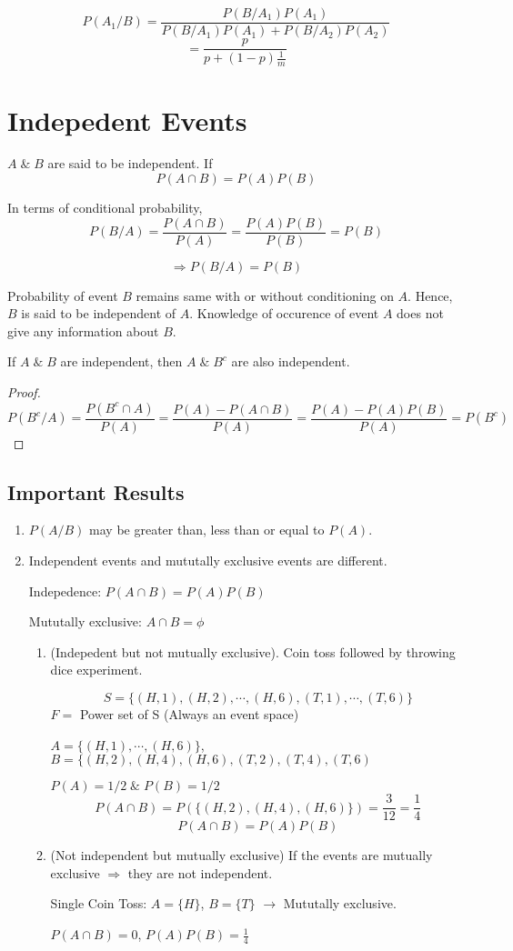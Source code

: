 \documentclass{article}
\begin{document}
$$ P(A_1/B)= \frac{P(B/A_1)P(A_1)}{P(B/A_1)P(A_1)+ P(B/A_2)P(A_2)}$$
$$ = \frac{p}{p + (1-p)\frac{1}{m}}$$

\section{Indepedent Events}
$A \;\&\; B$ are said to be independent. If
$$ P(A \cap B) = P(A)P(B)$$

In terms of conditional probability,
$$ P(B/A)= \frac{P(A \cap B)}{P(A)} = \frac{P(A)P(B)}{P(B)} = P(B)$$

$$ \Rightarrow P(B/A) = P(B)$$

Probability of event $B$ remains same with or without conditioning on $A$. Hence, $B$ is said to be independent of $A$.
Knowledge of occurence of event $A$ does not give any information about $B$.

If $A\; \&\; B $ are independent, then
$ A \;\&\; B^c$ are also independent.

\begin{proof}
    $$ P(B^c / A)= \frac{P(B^c \cap A)}{P(A)}= \frac{P(A)- P(A \cap B)}{P(A)}= \frac{P(A)- P(A)P(B)}{P(A)} = P(B^c)$$
\end{proof}

\subsection{Important Results}
\begin{enumerate}
    \item $P(A/B)$ may be greater than, less than or equal to $P(A)$.
    \item Independent events and mututally exclusive events are different.

    Indepedence: $P(A \cap B)= P(A)P(B)$

    Mututally exclusive: $A \cap B = \phi$

    \begin{enumerate}
        \item (Indepedent but not mutually exclusive). Coin toss followed by throwing dice experiment.

        $$ S=\{ (H,1), (H,2), \cdots, (H,6), (T,1), \cdots, (T,6)\}$$
        $F=$ Power set of S (Always an event space)

        $A=\{(H,1), \cdots, (H,6) \}$, $B= \{ (H,2), (H,4), (H,6), (T,2),(T,4),(T,6)$

        $P(A)= 1/2 \; \& \; P(B)= 1/2$
        $$ P(A \cap B)= P(\{ (H,2), (H,4), (H,6)\})= \frac{3}{12}= \frac{1}{4}$$
        $$ P(A\cap B)= P(A)P(B)$$
        \item (Not independent but mutually exclusive)
        If the events are mutually exclusive $\Rightarrow$ they are not independent.

        Single Coin Toss: $A= \{H \}$, $B= \{T \}$ $\rightarrow$ Mututally exclusive.

        $P(A \cap B)= 0$, $P(A)P(B)= \frac{1}{4}$



    \end{enumerate}
    \end{enumerate}
\end{document}
